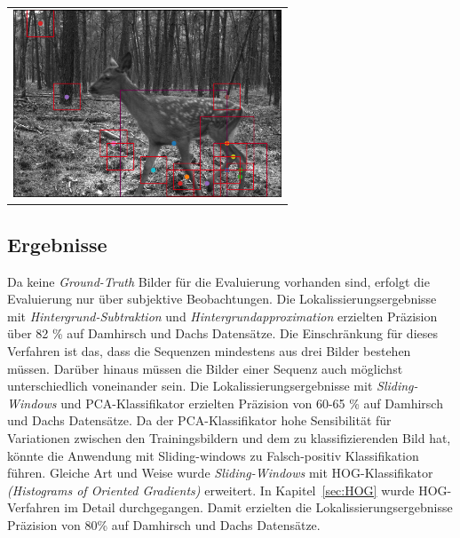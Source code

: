 \begin{center}
\begin{tabular}{c}
\includegraphics[width=8cm]{img/Segmentierung/localisation}
\end{tabular}
\label{fig:loc}
\end{center}

\subsection{Ergebnisse}
Da keine \textit{Ground-Truth} Bilder für die Evaluierung vorhanden sind, erfolgt die Evaluierung nur über subjektive Beobachtungen. Die Lokalissierungsergebnisse mit \textit{Hintergrund-Subtraktion} und \textit{Hintergrundapproximation} erzielten Präzision über 82 \% auf Damhirsch und Dachs Datensätze. 
Die Einschränkung für dieses Verfahren ist das, dass die Sequenzen mindestens aus drei Bilder bestehen müssen. Darüber hinaus müssen die Bilder einer Sequenz auch möglichst unterschiedlich voneinander sein. 
Die Lokalissierungsergebnisse mit \textit{Sliding-Windows} und PCA-Klassifikator erzielten Präzision von 60-65 \% auf Damhirsch und Dachs Datensätze. Da der PCA-Klassifikator hohe Sensibilität für Variationen zwischen den
Trainingsbildern und dem zu klassifizierenden Bild hat, könnte die Anwendung mit Sliding-windows zu Falsch-positiv Klassifikation führen. Gleiche Art und Weise wurde \textit{Sliding-Windows} mit HOG-Klassifikator \textit{(Histograms of Oriented Gradients)} erweitert. In Kapitel~\ref{sec:HOG} wurde HOG-Verfahren  im Detail durchgegangen. Damit erzielten die Lokalissierungsergebnisse Präzision von 80\% auf Damhirsch und Dachs Datensätze.




